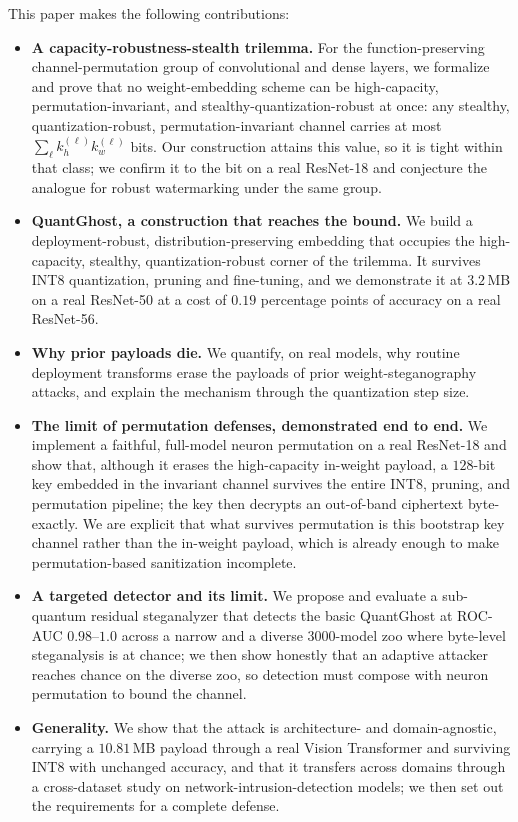 \documentclass[10pt,journal]{IEEEtran}
\theoremstyle{remark}
\newcommand{\sys}{\mbox{QuantGhost}}
\begin{document}
This paper makes the following contributions:
\begin{itemize}
\item \textbf{A capacity-robustness-stealth trilemma.} For the function-preserving
  channel-permutation group of convolutional and dense layers, we formalize and prove that
  no weight-embedding scheme can be high-capacity, permutation-invariant, and
  stealthy-quantization-robust at once: any stealthy, quantization-robust,
  permutation-invariant channel carries at most $\sum_\ell k_h^{(\ell)} k_w^{(\ell)}$ bits.
  Our construction attains this value, so it is tight within that class; we confirm it to the
  bit on a real ResNet-18 and conjecture the analogue for robust watermarking under the same
  group.
\item \textbf{\sys, a construction that reaches the bound.} We build a
  deployment-robust, distribution-preserving embedding that occupies the
  high-capacity, stealthy, quantization-robust corner of the trilemma. It survives INT8
  quantization, pruning and fine-tuning, and we demonstrate it at $3.2$\,MB on a real
  ResNet-50 at a cost of $0.19$ percentage points of accuracy on a real ResNet-56.
\item \textbf{Why prior payloads die.} We quantify, on real models, why routine
  deployment transforms erase the payloads of prior weight-steganography attacks, and
  explain the mechanism through the quantization step size.
\item \textbf{The limit of permutation defenses, demonstrated end to end.} We implement
  a faithful, full-model neuron permutation on a real ResNet-18 and show that, although it
  erases the high-capacity in-weight payload, a $128$-bit key embedded in the invariant
  channel survives the entire INT8, pruning, and permutation pipeline; the key then decrypts
  an out-of-band ciphertext byte-exactly. We are explicit that what survives permutation is
  this bootstrap key channel rather than the in-weight payload, which is already enough to
  make permutation-based sanitization incomplete.
\item \textbf{A targeted detector and its limit.} We propose and evaluate a sub-quantum
  residual steganalyzer that detects the basic \sys{} at ROC-AUC $0.98$--$1.0$ across a
  narrow and a diverse $3000$-model zoo where byte-level steganalysis is at chance; we then
  show honestly that an adaptive attacker reaches chance on the diverse zoo, so detection
  must compose with neuron permutation to bound the channel.
\item \textbf{Generality.} We show that the attack is architecture- and domain-agnostic,
  carrying a $10.81$\,MB payload through a real Vision Transformer and surviving INT8 with
  unchanged accuracy, and that it transfers across domains through a cross-dataset study on
  network-intrusion-detection models; we then set out the requirements for a complete defense.
\end{itemize}
\end{document}
